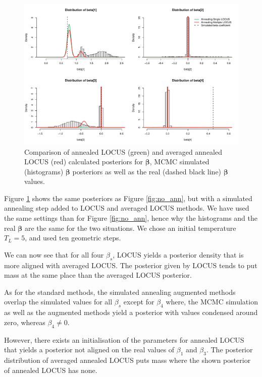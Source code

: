 \documentclass[a4paper, 11pt]{report}
\numberwithin{equation}{chapter}
\begin{document}
\begin{figure}[h]
\includegraphics[width=\textwidth, bb=0 0 800px 600px]{images/annealing.pdf}
\caption{\label{fig:ann}Comparison of annealed LOCUS (green) and averaged annealed LOCUS (red) calculated posteriors for $\boldsymbol{\beta}$, MCMC simulated (histograms) $\boldsymbol{\beta}$ posteriors as well as the real (dashed black line) $\boldsymbol{\beta}$ values.}
\end{figure}
Figure \ref{fig:ann} shows the same posteriors as Figure \ref{fig:no_ann}, but with a simulated annealing step added to LOCUS and averaged LOCUS methods. We have used the same settings than for Figure \ref{fig:no_ann}, hence why the histograms and the real $
\boldsymbol{\beta}$ are the same for the two situations. We chose an initial temperature $T_L = 5$, and used ten geometric steps.

We can now see that for all four $\beta_s$, LOCUS yields a posterior density that is more aligned with averaged LOCUS. The posterior given by LOCUS tends to put mass at the same place than the averaged LOCUS posterior.

As for the standard methods, the simulated annealing augmented methods overlap the simulated values for all $\beta_s$ except for $\beta_4$ where, the MCMC simulation as well as the augmented methods yield a posterior with values condensed around zero, whereas $\beta_4 \neq 0$.

However, there exists an initialisation of the parameters for annealed LOCUS that yields a posterior not aligned on the real values of $\beta_1$ and $\beta_3$. The posterior distribution of averaged annealed LOCUS puts mass where the shown posterior of annealed LOCUS has none.
\end{document}
